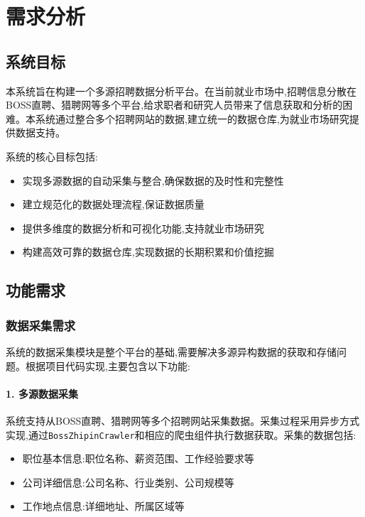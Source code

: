 \section{需求分析}

\subsection{系统目标}

本系统旨在构建一个多源招聘数据分析平台。在当前就业市场中,招聘信息分散在BOSS直聘、猎聘网等多个平台,给求职者和研究人员带来了信息获取和分析的困难。本系统通过整合多个招聘网站的数据,建立统一的数据仓库,为就业市场研究提供数据支持。

系统的核心目标包括:
\begin{itemize}
    \item 实现多源数据的自动采集与整合,确保数据的及时性和完整性
    \item 建立规范化的数据处理流程,保证数据质量
    \item 提供多维度的数据分析和可视化功能,支持就业市场研究
    \item 构建高效可靠的数据仓库,实现数据的长期积累和价值挖掘
\end{itemize}

\subsection{功能需求}

\subsubsection{数据采集需求}

系统的数据采集模块是整个平台的基础,需要解决多源异构数据的获取和存储问题。根据项目代码实现,主要包含以下功能:

\paragraph{1. 多源数据采集}
系统支持从BOSS直聘、猎聘网等多个招聘网站采集数据。采集过程采用异步方式实现,通过\texttt{BossZhipinCrawler}和相应的爬虫组件执行数据获取。采集的数据包括:
\begin{itemize}
    \item 职位基本信息:职位名称、薪资范围、工作经验要求等
    \item 公司详细信息:公司名称、行业类别、公司规模等
    \item 工作地点信息:详细地址、所属区域等
\end{itemize}

